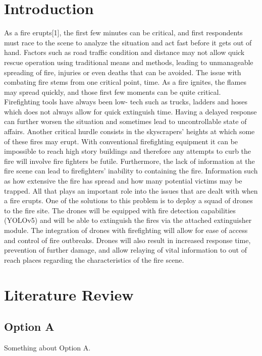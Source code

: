 \documentclass[conference]{IEEEtran}
\begin{document}
\section{Introduction}
As a fire erupts[1], the first few minutes can be critical, and first respondents must race to the scene to analyze the situation and act fast before it gets out of hand. Factors such as road traffic condition and distance may not allow quick rescue operation using traditional means and methods, leading to unmanageable spreading of fire, injuries or even deaths that can be avoided. The issue with combating fire stems from one critical point, time. As a fire ignites, the flames may
spread quickly, and those first few moments can be quite critical. Firefighting tools have always been low-
tech such as trucks, ladders and hoses which does not always allow for quick extinguish time. Having a
delayed response can further worsen the situation and sometimes lead to uncontrollable state of affairs.
Another critical hurdle consists in the skyscrapers’ heights at which some of these fires may erupt. With conventional firefighting equipment it can be impossible to reach high story buildings and therefore any
attempts to curb the fire will involve fire fighters be futile. Furthermore, the lack of information at the fire
scene can lead to firefighters’ inability to containing the fire. Information such as how extensive the fire has
spread and how many potential victims may be trapped. All that plays an important role into the issues that
are dealt with when a fire erupts. One of the solutions to this problem is to deploy a squad of drones to the fire site. The drones will be equipped with fire detection capabilities (YOLOv5) and will be able to extinguish the fires via the attached extinguisher module.  The integration of drones with firefighting will allow for ease of access and control of fire outbreaks. Drones will also result in increased response time, prevention of further damage, and allow relaying of vital information to out of reach places regarding the characteristics of the fire scene.

\section{Literature Review}

\subsection{Option A}

Something about Option A.
\end{document}
